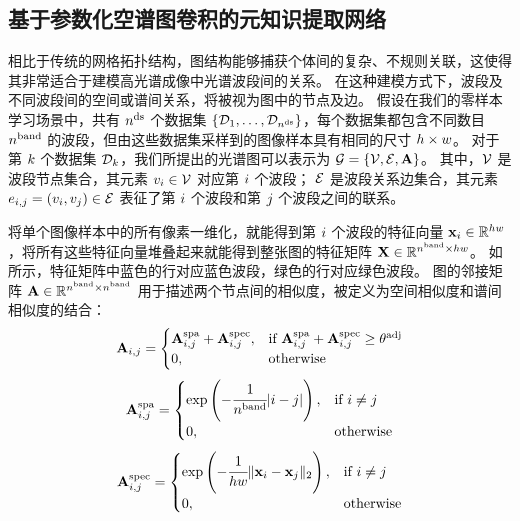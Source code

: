 \subsection{基于参数化空谱图卷积的元知识提取网络}
相比于传统的网格拓扑结构，图结构能够捕获个体间的复杂、不规则关联，这使得其非常适合于建模高光谱成像中光谱波段间的关系。
在这种建模方式下，波段及不同波段间的空间或谱间关系，将被视为图中的节点及边。
假设在我们的零样本学习场景中，共有 ${n^\text{ds}}$ 个数据集 $\{ \mathcal{D}_1, \dots, \mathcal{D}_{n^\text{ds}} \}$，每个数据集都包含不同数目 ${n^\text{band}}$ 的波段，但由这些数据集采样到的图像样本具有相同的尺寸 $h \times w$。
对于第 $k$ 个数据集 $\mathcal{D}_k$，我们所提出的光谱图可以表示为 $\mathcal{G} = \{\mathcal{V}, \mathcal{E}, \mathbf{A}\}$。
其中，$\mathcal{V}$ 是波段节点集合，其元素 $v_{i} \in \mathcal{V}$ 对应第 $i$ 个波段；
$\mathcal{E}$ 是波段关系边集合，其元素 $e_{i,j} = (v_{i}, v_{j}) \in \mathcal{E}$ 表征了第 $i$ 个波段和第 $j$ 个波段之间的联系。
\par
将单个图像样本中的所有像素一维化，就能得到第 $i$ 个波段的特征向量 $\mathbf{x}_{i} \in \mathbb{R}^{hw}$，将所有这些特征向量堆叠起来就能得到整张图的特征矩阵 $\mathbf{X} \in \mathbb{R}^{{n^\text{band}} \times hw}$。
如所示，特征矩阵中蓝色的行对应蓝色波段，绿色的行对应绿色波段。
图的邻接矩阵 $\mathbf{A} \in \mathbb{R}^{{n^\text{band}} \times {n^\text{band}}}$ 用于描述两个节点间的相似度，被定义为空间相似度和谱间相似度的结合：
\begin{equation}
    \mathbf{A}_{i,j} =
    \begin{cases}
        \mathbf{A}_{i,j}^\text{spa} + \mathbf{A}_{i,j}^\text{spec},&\text{if } \mathbf{A}_{i,j}^\text{spa} + \mathbf{A}_{i,j}^\text{spec} \ge \theta^\text{adj} \\
        0,&\text{otherwise}
    \end{cases}
    \label{eqn:adj}
\end{equation}
\begin{equation}
    \mathbf{A}_{i,j}^\text{spa} =
    \begin{cases}
        \exp \left( - \cfrac{1}{{n^\text{band}}} \vert i-j \vert \right),&\text{if } i \neq j \\
        0,&\text{otherwise}
    \end{cases}
    \label{eqn:adj-spa}
\end{equation}
\begin{equation}
    \mathbf{A}_{i,j}^\text{spec} =
    \begin{cases}
        \exp \left( - \cfrac{1}{hw} \Vert \mathbf{x}_{i} - \mathbf{x}_{j} \Vert_2 \right),&\text{if } i \neq j \\
        0,&\text{otherwise}
    \end{cases}
    \label{eqn:adj-spec}
\end{equation}
